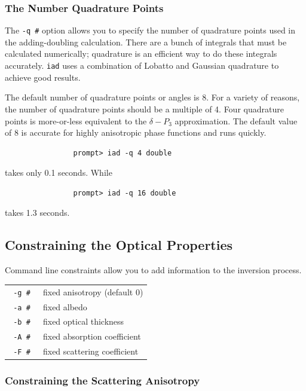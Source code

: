 \documentclass{article}
\newcommand\iadprog{\texttt{iad}}
\begin{document}
\subsubsection{The Number Quadrature Points}
The \texttt{-q \#} option allows you to specify the number of quadrature
points used in the adding-doubling calculation.  There are a bunch of 
integrals that must be calculated numerically; quadrature is an efficient 
way to do these integrals accurately.  \iadprog{} uses a combination of 
Lobatto and Gaussian quadrature to achieve good results.

The default number of quadrature points or angles is 8.
For a variety of reasons, the number of quadrature points should be a
multiple of 4.  Four quadrature points is more-or-less equivalent to the
$\delta-P_3$ approximation.  The default value of 8 is accurate for highly
anisotropic phase functions and runs quickly.
\begin{verbatim}
                prompt> iad -q 4 double
\end{verbatim}
takes only 0.1 seconds.  While
\begin{verbatim}
                prompt> iad -q 16 double
\end{verbatim}
takes 1.3 seconds.

\subsection{Constraining the Optical Properties}

Command line constraints allow you to add information to the inversion 
process.

\begin{center}
\begin{tabular}{lp{7cm}}
\texttt{ -g \#               }& fixed anisotropy (default 0)               \\
\texttt{ -a \#               }& fixed albedo                               \\
\texttt{ -b \#               }& fixed optical thickness                    \\
\texttt{ -A \#               }& fixed absorption coefficient               \\
\texttt{ -F \#               }& fixed scattering coefficient               \\[3mm]
\end{tabular}
\end{center}

\subsubsection{Constraining the Scattering Anisotropy}
\end{document}
